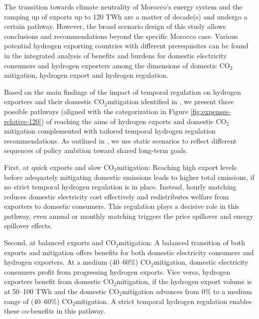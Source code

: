 \documentclass[5p,numafflabel]{elsarticle}
\newcommand{\co}{\ce{CO2}~}
\def\co{CO${}_2${\:}}
\begin{document}
The transition towards climate neutrality of Morocco's energy system and the ramping up of exports up to 120 TWh are a matter of decade(s) and undergo a certain pathway. 
However, the broad scenario design of this study allows conclusions and recommendations beyond the specific Morocco case.
Various potential hydrogen exporting countries with different prerequisites can be found in the integrated analysis of benefits and burdens for domestic electricity consumers and hydrogen exporters among the dimensions of domestic \co mitigation, hydrogen export and hydrogen regulation.

Based on the main findings of the impact of temporal regulation on hydrogen exporters and their domestic \co mitigation identified in , we present three possible pathways (aligned with the categorization in Figure \ref{fig:expenses-relative-120}) of reaching the aims of hydrogen exports and domestic \co mitigation complemented with tailored temporal hydrogen regulation recommendations.
As outlined in , we use static scenarios to reflect different sequences of policy ambition toward shared long-term goals.

First, at quick exports and slow \co mitigation: Reaching high export levels before adequately mitigating domestic emissions leads to higher total emissions, if no strict temporal hydrogen regulation is in place. Instead, hourly matching reduces domestic electricity cost effectively and redistributes welfare from exporters to domestic consumers. This regulation plays a decisive role in this pathway, even annual or monthly matching triggers the price spillover and energy spillover effects.

Second, at balanced exports and \co mitigation: A balanced transition of both exports and mitigation offers benefits for both domestic electricity consumers and hydrogen exporters. At a medium (40--60\%) \co mitigation, domestic electricity consumers profit from progressing hydrogen exports. Vice versa, hydrogen exporters benefit from domestic \co mitigation, if the hydrogen export volume is at 50--100 TWh and the domestic \co mitigation advances from 0\% to a medium range of (40--60\%) \co mitigation. A strict temporal hydrogen regulation enables these co-benefits in this pathway.
\end{document}
